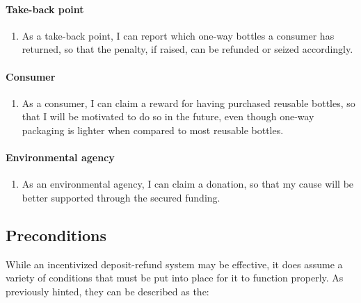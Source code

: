 \paragraph{Take-back point}
\begin{enumerate}[resume, font=\sffamily, label={\textbf{FR-\protect\twodigits{\theenumi}}},leftmargin=1.4cm, ref=FR-\protect\twodigits{\theenumi}]
	\item As a take-back point, I can report which one-way bottles a consumer has returned, so that the penalty, if raised, can be refunded or seized accordingly. \label{itm:reportOneWayReturn}
\end{enumerate}

\paragraph{Consumer}
\begin{enumerate}[resume, font=\sffamily, label={\textbf{FR-\protect\twodigits{\theenumi}}},leftmargin=1.4cm, ref=FR-\protect\twodigits{\theenumi}]  
	\item As a consumer, I can claim a reward for having purchased reusable bottles, so that I will be motivated to do so in the future, even though one-way packaging is lighter when compared to most reusable bottles. \label{itm:claimReward}
\end{enumerate}

\paragraph{Environmental agency}
\begin{enumerate}[resume, font=\sffamily, label={\textbf{FR-\protect\twodigits{\theenumi}}},leftmargin=1.4cm, ref=FR-\protect\twodigits{\theenumi}]  
	\item As an environmental agency, I can claim a donation, so that my cause will be better supported through the secured funding. \label{itm:claimDonation}
\end{enumerate}
	
\subsection{Preconditions}
\label{sec:preconditions}
While an incentivized deposit-refund system may be effective, it does assume a variety of conditions that must be put into place for it to function properly. As previously hinted, they can be described as the:

